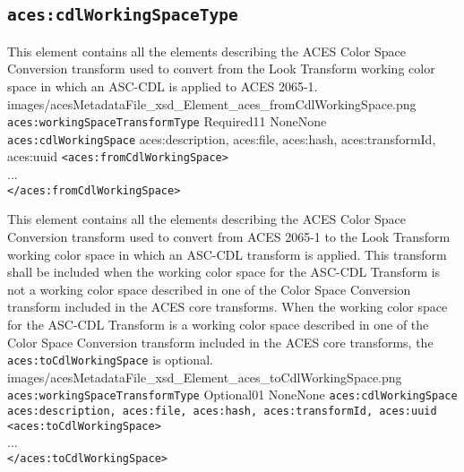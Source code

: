 \subsection{\texttt{aces:cdlWorkingSpaceType}}

        {This element contains all the elements describing the ACES Color Space Conversion transform used to convert from the Look Transform working color space in which an ASC-CDL is applied to ACES 2065-1.}
        {images/acesMetadataFile_xsd_Element_aces_fromCdlWorkingSpace.png}
        {\texttt{aces:workingSpaceTransformType}}
        {Required}{1}{1}
        {None}{None}
        {\texttt{aces:cdlWorkingSpace}}
        {aces:description, aces:file, aces:hash, aces:transformId, aces:uuid}
        {\lstinline{<aces:fromCdlWorkingSpace>} \\
        ... \\
        \lstinline{</aces:fromCdlWorkingSpace>}}

        {This element contains all the elements describing the ACES Color Space Conversion transform used to convert from ACES 2065-1 to the Look Transform working color space in which an ASC-CDL transform is applied.  This transform shall be included when the working color space for the ASC-CDL Transform is not a working color space described in one of the Color Space Conversion transform included in the ACES core transforms.  When the working color space for the ASC-CDL Transform is a working color space described in one of the Color Space Conversion transform included in the ACES core transforms, the \texttt{aces:toCdlWorkingSpace} is optional.}
        {images/acesMetadataFile_xsd_Element_aces_toCdlWorkingSpace.png}
        {\texttt{aces:workingSpaceTransformType}}
        {Optional}{0}{1}
        {None}{None}
        {\texttt{aces:cdlWorkingSpace}}
        {\texttt{aces:description, aces:file, aces:hash, aces:transformId, aces:uuid}}
        {\lstinline{<aces:toCdlWorkingSpace>} \\
        ... \\
        \lstinline{</aces:toCdlWorkingSpace>}}
        